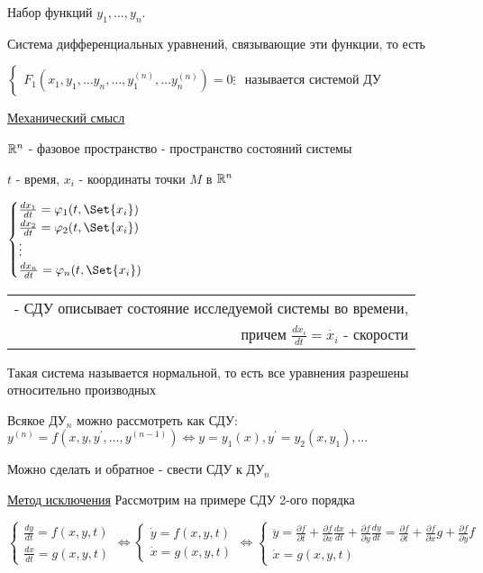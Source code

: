 \documentclass[12pt]{article}
\begin{document}
    \Def Набор функций $y_1, \dots, y_n$.

    Система дифференциальных уравнений, связывающие эти функции, то есть

    $\begin{cases}
         F_1(x_1, y_1, \dots y_n, \dots, y_1^{(n)}, \dots y_n^{(n)}) = 0
         \vdots
    \end{cases}$ называется системой ДУ

    \vspace{5mm}

    \underline{Механический смысл}

    $\mathbb{R}^n$ - фазовое пространство - пространство состояний системы

    $t$ - время, $x_i$ - координаты точки $M$ в $\mathbb{R}^n$

    $\begin{cases}
         \frac{dx_1}{dt} = \varphi_1(t, \Set{x_i}) \\
         \frac{dx_2}{dt} = \varphi_2(t, \Set{x_i}) \\
         \vdots \\
         \frac{dx_n}{dt} = \varphi_n(t, \Set{x_i}) \\
    \end{cases}$ \begin{tabular}{r} - СДУ описывает состояние исследуемой системы во времени, \\ причем $\frac{dx_i}{dt} = \dot{x_i}$ - скорости \end{tabular}

    \Nota Такая система называется нормальной, то есть все уравнения разрешены относительно производных

    \Nota Всякое ДУ$_n$ можно рассмотреть как СДУ: $y^{(n)} = f(x, y, y^\prime, \dots, y^{(n - 1)}) \Longleftrightarrow y = y_1(x), y^\prime = y_2(x, y_1), \dots$

    Можно сделать и обратное - свести СДУ к ДУ$_n$

    \underline{Метод исключения} Рассмотрим на примере СДУ 2-ого порядка

    $\begin{cases}
         \frac{dy}{dt} = f(x, y, t) \\
         \frac{dx}{dt} = g(x, y, t)
    \end{cases} \Longleftrightarrow \begin{cases}
         \dot{y} = f(x, y, t) \\
         \dot{x} = g(x, y, t)
    \end{cases} \Longleftrightarrow \begin{cases}
         \ddot y = \frac{\partial f}{\partial t} + \frac{\partial f}{\partial x}\frac{dx}{dt} + \frac{\partial f}{\partial y}\frac{dy}{dt} = \frac{\partial f}{\partial t} + \frac{\partial f}{\partial x}g + \frac{\partial f}{\partial y}f \\
         \dot{x} = g(x, y, t)
    \end{cases}$
\end{document}
